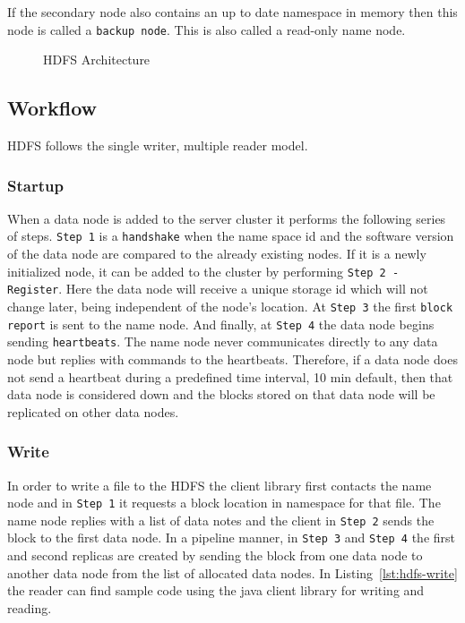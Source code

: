 \documentclass{sig-alternate}
\begin{document}
If the secondary node also contains an up to date namespace in memory then this node is called a \texttt{backup node}. This is also called a read-only name node. 

\begin{figure}[!hbt]
\centering
{}
\caption{HDFS Architecture}
\label{fig:hdfs_architecture}
\end{figure}

\subsection{Workflow}
HDFS follows the single writer, multiple reader model. 

\subsubsection{Startup}
When a data node is added to the server cluster it performs the following series of steps.
\texttt{Step 1} is a \texttt{handshake} when the name space id and the software version of the data node are compared to the already existing nodes. If it is a newly initialized node, it can be added to the cluster by performing \texttt{Step 2 - Register}. Here the data node will receive a unique storage id which will not change later, being independent of the node's location.
At \texttt{Step 3} the first \texttt{block report} is sent to the name node. And finally, at \texttt{Step 4} the data node begins sending \texttt{heartbeats}. The name node never communicates directly to any data node but replies with commands to the heartbeats. Therefore, if a data node does not send a heartbeat during a predefined time interval, 10 min default, then that data node is considered down and the blocks stored on that data node will be replicated on other data nodes.

\subsubsection{Write}
In order to write a file to the HDFS the client library first contacts the name node and in \texttt{Step 1} it requests a block location in namespace for that file. 
The name node replies with a list of data notes and the client in \texttt{Step 2} sends the block to the first data node.
In a pipeline manner, in \texttt{Step 3} and \texttt{Step 4} the first and second replicas are created by sending the block from one data node to another data node from the list of allocated data nodes. In Listing~\ref{lst:hdfs-write} the reader can find sample code using the java client library for writing and reading.
\end{document}
